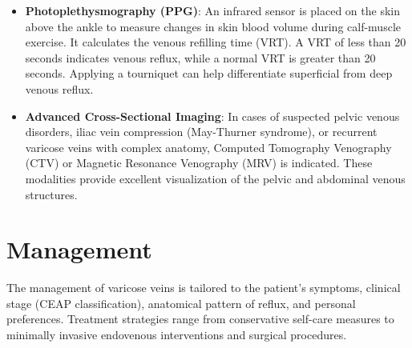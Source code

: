 \begin{itemize}
\item \textbf{Photoplethysmography (PPG)}: An infrared sensor is placed on the skin above the ankle to measure changes in skin blood volume during calf-muscle exercise. It calculates the venous refilling time (VRT). A VRT of less than 20 seconds indicates venous reflux, while a normal VRT is greater than 20 seconds. Applying a tourniquet can help differentiate superficial from deep venous reflux.
\item \textbf{Advanced Cross-Sectional Imaging}: In cases of suspected pelvic venous disorders, iliac vein compression (May-Thurner syndrome), or recurrent varicose veins with complex anatomy, Computed Tomography Venography (CTV) or Magnetic Resonance Venography (MRV) is indicated. These modalities provide excellent visualization of the pelvic and abdominal venous structures.
\end{itemize}

\section*{Management}
The management of varicose veins is tailored to the patient's symptoms, clinical stage (CEAP classification), anatomical pattern of reflux, and personal preferences. Treatment strategies range from conservative self-care measures to minimally invasive endovenous interventions and surgical procedures.

